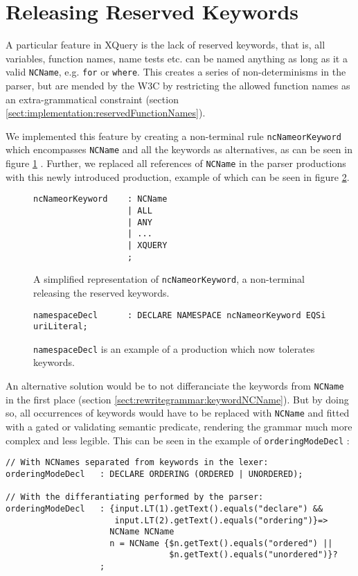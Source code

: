 \section{Releasing Reserved Keywords}
\label{sect:impl:reserved_keywords}
A particular feature in XQuery is the lack of reserved keywords, that is, all variables, function names, name tests etc. can be named anything as long as it a valid \verb!NCName!, e.g. \verb!for! or \verb!where!. This creates a series of non-determinisms in the parser, but are mended by the W3C by restricting the allowed function names as an extra-grammatical constraint (section \ref{sect:implementation:reservedFunctionNames}).

We implemented this feature by creating a non-terminal rule \verb!ncNameorKeyword! which encompasses \verb!NCName! and all the keywords as alternatives, as can be seen in figure \ref{fig:ncnNameorKeyword} . Further, we replaced all references of \verb!NCName! in the parser productions with this newly introduced production, example of which can be seen in figure \ref{fig:namespaceDeclKeywordfree}.

\begin{figure}[h!]
\begin{Verbatim}
ncNameorKeyword    : NCName
                   | ALL
                   | ANY
                   | ...
                   | XQUERY
                   ;
\end{Verbatim}
\label{fig:ncnNameorKeyword}
\caption[\texttt{ncNameorKeyword} releases the reserved keywords]{A simplified representation of \texttt{ncNameorKeyword}, a non-terminal releasing the reserved keywords.}
\end{figure}

\begin{figure}[h!]
\begin{Verbatim}
namespaceDecl      : DECLARE NAMESPACE ncNameorKeyword EQSi uriLiteral;
\end{Verbatim}
\label{fig:namespaceDeclKeywordfree}
\caption[Example of a production permitting keywords]{\texttt{namespaceDecl} is an example of a production which now tolerates keywords.}
\end{figure}

An alternative solution would be to not differanciate the keywords from \verb!NCName! in the first place (section \ref{sect:rewritegrammar:keywordNCName}). But by doing so, all occurrences of keywords would have to be replaced with \verb!NCName! and fitted with a gated or validating semantic predicate, rendering the grammar much more complex and less legible. This can be seen in the example of \verb!orderingModeDecl! :
\begin{Verbatim}
// With NCNames separated from keywords in the lexer:
orderingModeDecl   : DECLARE ORDERING (ORDERED | UNORDERED);

// With the differantiating performed by the parser:
orderingModeDecl   : {input.LT(1).getText().equals("declare") && 
                      input.LT(2).getText().equals("ordering")}=>
                     NCName NCName
                     n = NCName {$n.getText().equals("ordered") || 
                                 $n.getText().equals("unordered")}?
                   ;
\end{Verbatim}

